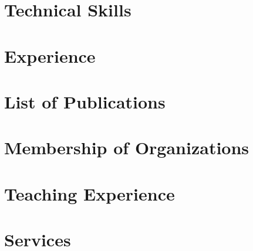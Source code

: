 \documentclass[]{res}
\begin{document}
\begin{resume}
\section{Technical Skills}
\vspace*{0.1in}


\section{Experience}
\vspace*{0.2in} 



%


\section{List of Publications}
\vspace*{0.2in}


\section{Membership of Organizations}
\vspace*{0.2in}


\section{Teaching Experience}
\vspace*{0.2in}


\section{Services}
\vspace*{0.2in}

\end{resume}
\end{document}
